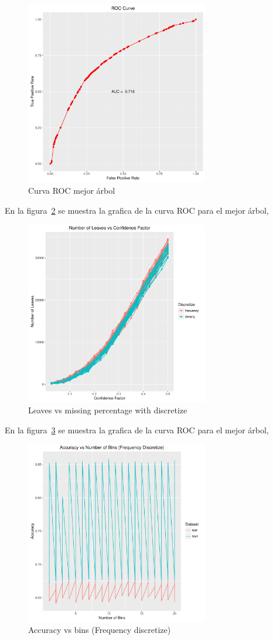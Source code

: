 \begin{figure}
  \centering
  \includegraphics[width = 8cm]{6c.pdf}
  \caption{Curva ROC mejor árbol}
  \label{fig:6c}
\end{figure}

En la figura~\ref{fig:6d} se muestra la grafica de la curva ROC para el mejor árbol,

\begin{figure}
  \centering
  \includegraphics[width = 8cm]{6d.pdf}
  \caption{Leaves vs missing percentage with discretize}
  \label{fig:6d}
\end{figure}

En la figura~\ref{fig:6e} se muestra la grafica de la curva ROC para el mejor árbol,

\begin{figure}
  \centering
  \includegraphics[width = 8cm]{6e.pdf}
  \caption{Accuracy vs bins (Frequency discretize)}
  \label{fig:6e}
\end{figure}


